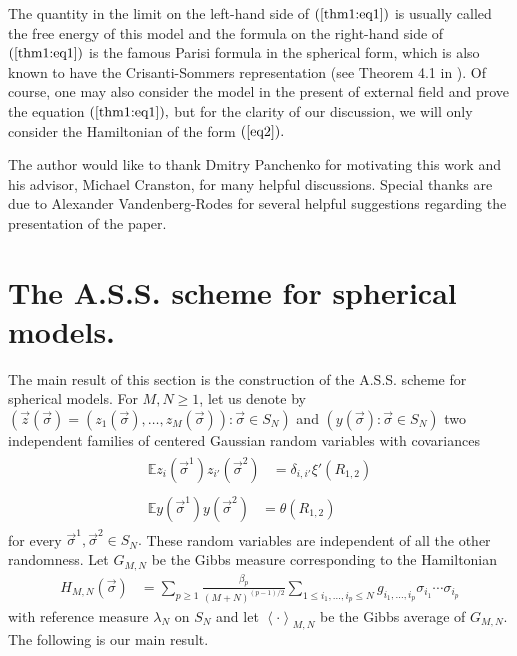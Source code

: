 \documentclass[12pt]{article}
\newcommand{\vsi}{{\vec{\sigma}}}
\newcommand{\vz}{\vec{z}}
\newenvironment{Proof of lemma}{\noindent{\bf Proof of Lemma}}{\hfill$\Box$\newline}
\newenvironment{Proof of theorem}{\noindent{\bf Proof of Theorem}}{\hfill{\footnotesize${\square}$}\newline}
\newenvironment{Proof of theorems}{\noindent{\bf Proof of Theorems}}{\hfill$\Box$\newline}
\newenvironment{Proof of proposition}{\noindent{\bf Proof of Proposition}}{\hfill$\Box$\newline}
\newenvironment{Proof of propositions}{\noindent{\bf Proof of Propositions}}{\hfill$\Box$\newline}
\newenvironment{Proof of exercise}{\noindent{\it Proof of Exercise:}}{\hfill$\Box$}
\numberwithin{equation}{section}
\begin{document}
\noindent 
The quantity in the limit on the left-hand side of $(\ref{thm1:eq1})$ is usually called the free energy of this model and the formula on the right-hand side of $(\ref{thm1:eq1})$ is the famous Parisi formula in the spherical form, which is also known to have the Crisanti-Sommers representation \cite{CS92} (see Theorem 4.1 in \cite{Tal061}). Of course, one may also consider the model in the present of external field and prove the equation $(\ref{thm1:eq1}),$  but for the clarity of our discussion, we will only consider the Hamiltonian of the form $(\ref{eq2}).$

\smallskip

 The author would like to thank Dmitry Panchenko for motivating this work and his advisor, Michael Cranston, for many helpful discussions. Special thanks are due to Alexander Vandenberg-Rodes for several helpful suggestions regarding the presentation of the paper.


\section{The A.S.S. scheme for spherical models.}

\noindent The main result of this section is the construction of the A.S.S. scheme for spherical models. For $M,N\geq 1$, let us denote by $(\vz(\vsi)=(z_1(\vsi),\ldots,z_M(\vsi)):\vsi\in S_N)$ and $(y(\vsi):\vsi\in S_N)$ two independent families of centered Gaussian random variables with covariances
\begin{align}
\begin{split}\label{ASS:eq0.1}
\mathbb{E}z_i(\vsi^1)z_{i'}(\vsi^2)&=\delta_{i,i'}\xi'(R_{1,2})
\end{split}\\
\begin{split}\label{ASS:eq0.2}
\mathbb{E}y(\vsi^1)y(\vsi^2)&=\theta(R_{1,2})
\end{split}
\end{align}
for every $\vsi^1,\vsi^2\in S_N.$ These random variables are independent of all the other randomness. Let $G_{M,N}$ be the Gibbs measure corresponding to the Hamiltonian 
\begin{align}
\label{ASS:eq1}
H_{M,N}(\vsi)&=\sum_{p\geq 1}\frac{\beta_p}{(M+N)^{(p-1)/2}}\sum_{1\leq i_1,\ldots,i_p\leq N}g_{i_1,\ldots,i_{p}}\sigma_{i_1}\cdots\sigma_{i_p}
\end{align}
with reference measure $\lambda_N$ on $S_N$ and let $\left<\cdot\right>_{M,N}$ be the Gibbs average of $G_{M,N}.$
The following is our main result.
\end{document}
